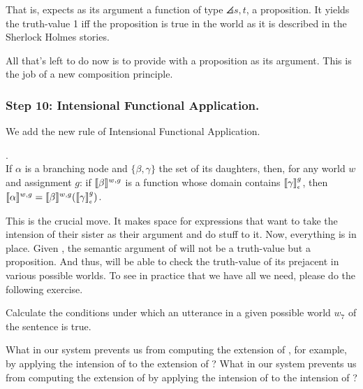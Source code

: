 That is,  expects as its argument a function of type $\angles{s,t}$, a proposition. It yields the truth-value 1 iff the proposition is true in the world as it is described in the Sherlock Holmes stories.

All that's left to do now is to provide  with a proposition as its argument. This is the job of a new composition principle.

\subsubsection{Step 10: Intensional Functional Application.} \label{sec:intens-funct-appl}

We add the new rule of Intensional Functional Application.

\ex. \\
If $\alpha$ is a branching node and $\{\beta, \gamma\}$ the set of its daughters, then, for any world $w$ and assignment $g$: if $\llbracket \beta \rrbracket^{w,g}$ is a function whose domain contains $\svcent{\gamma}^g$, then $\sv{\alpha}^{w,g} = \sv{\beta}^{w,g} (\svcent{\gamma}^g)$.

This is the crucial move. It makes space for expressions that want to take the intension of their sister as their argument and do stuff to it. Now, everything is in place. Given \LLast, the semantic argument of  will not be a truth-value but a proposition. And thus,  will be able to check the truth-value of its prejacent in various possible worlds. To see in practice that we have all we need, please do the following exercise.

\begin{exercise}
	Calculate the conditions under which an utterance in a given possible world $w_7$ of the sentence  is true. \eex 
\end{exercise}

\begin{exercise}
	What in our system prevents us from computing the extension of , for example, by applying the intension of  to the extension of ? What in our system prevents us from computing the extension of  by applying the intension of  to the intension of ? \eex
\end{exercise}

